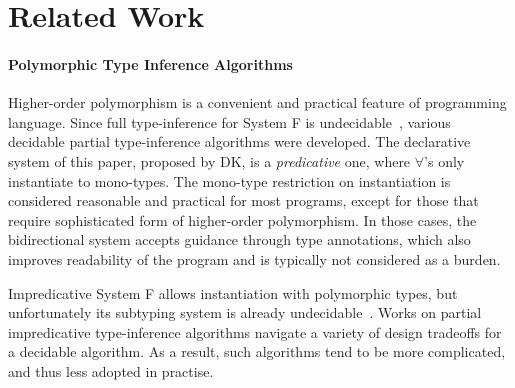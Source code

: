 \section{Related Work}

\paragraph{Polymorphic Type Inference Algorithms}
Higher-order polymorphism is a convenient and practical feature of programming language.
Since full type-inference for System F is undecidable~\cite{wells1999typability},
various decidable partial type-inference algorithms were developed.
The declarative system of this paper, proposed by DK, is a \emph{predicative} one,
where $\forall$'s only instantiate to mono-types.
The mono-type restriction on instantiation is considered reasonable and practical for most programs,
except for those that require sophisticated form of higher-order polymorphism.
In those cases, the bidirectional system accepts guidance through type annotations,
which also improves readability of the program and is typically not considered as a burden.

Impredicative System F allows instantiation with polymorphic types,
but unfortunately its subtyping system is already undecidable~\cite{tiuryn1996subtyping}.
Works on partial impredicative type-inference algorithms\cite{le2003ml,leijen2008hmf,vytiniotis2008fph}
navigate a variety of design tradeoffs for a decidable algorithm.
As a result, such algorithms tend to be more complicated, and thus less adopted in practise.



